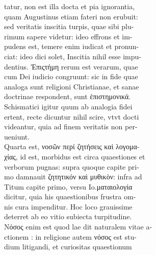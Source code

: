 \documentclass{article}
\begin{document}
\begin{pages}
                tatur, non est illa docta et pia ignorantia, \\
                quam Augustinus etiam fateri non erubuit: \\
                sed veritatis inscitia turpis, quae sibi plu- \\
                rimum sapere videtur: ideo effrons et im- \\
                pudens est, temere enim iudicat et pronun- \\
                ciat: ideo dici solet, Inscitia nihil esse impu- \\
                dentius. Ἐπιςτήμη rerum est verarum, quae \\
                cum Dei iudicio congruunt: sic in fide quae \\
                analoga sunt religioni Christianae, et sanae \\
                doctrinae respondent, sunt ἑπιστημονικά. \\
                Schismatici igitur quum ab analogia fidei \\
                ertent, recte dicuntur nihil scire, vtvt docti \\
                videantur, quia ad finem veritatis non per- \\
                ueniunt. \\
                Quarta est, νοσῶν περί ζητήσεις καὶ λογομα- \\
                χίας, id est, morbidus est circa quaestiones et \\
                verborum pugnas: supra quoque capite pri- \\
                mo damnauit ζητητικόν καὶ μυθικὸν: infra ad \\
                Titum capite primo, versu Io.ματαιολογία \\
                dicitur, quia his quaestionibus frustra om- \\
                nis cura impenditur. Hoc loco grauissime \\
                deterret ab eo vitio subiecta turpitudine. \\
                Νόσος  enim est quod lae dit naturalem vitae a- \\
                ctionem : in religione autem νόσος est stu- \\
                dium litigandi, et curiositas quaestionum \\

\end{pages}
\end{document}
